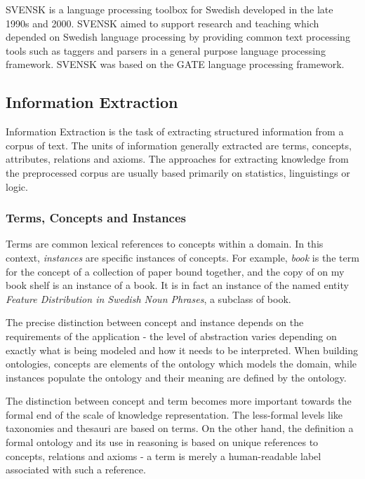 \documentclass[a4paper]{report}
\newcommand{\todo}[1]{}
\begin{document}
SVENSK is a language processing toolbox for Swedish developed in the late 1990s and 2000\cite{OlssonGamback00SVENSK}. SVENSK aimed to support research and teaching which depended on Swedish language processing by providing common text processing tools such as taggers and parsers in a general purpose language processing framework. SVENSK was based on the GATE language processing framework.

\subsection{Information Extraction}
\label{subsec:background:info_extraction}

Information Extraction is the task of extracting structured information from a corpus of text.
The units of information generally extracted are terms, concepts, attributes, relations and axioms.
The approaches for extracting knowledge from the preprocessed corpus are usually based primarily on statistics, linguistings or logic.

\subsubsection{Terms, Concepts and Instances}

Terms are common lexical references to concepts within a domain.
In this context, \emph{instances} are specific instances of concepts.
For example, \emph{book} is the term for the concept of a collection of paper bound together, and the copy of \todo{cite noun phrase book} on my book shelf is an instance of a book.
It is in fact an instance of the named entity \emph{Feature Distribution in Swedish Noun Phrases}, a subclass of book.

The precise distinction between concept and instance depends on the requirements of the application - the level of abstraction varies depending on exactly what is being modeled and how it needs to be interpreted.
When building ontologies, concepts are elements of the ontology which models the domain, while instances populate the ontology and their meaning are defined by the ontology.

The distinction between concept and term becomes more important towards the formal end of the scale of knowledge representation.
The less-formal levels like taxonomies and thesauri are based on terms.
On the other hand, the definition a formal ontology and its use in reasoning is based on unique references to concepts, relations and axioms - a term is merely a human-readable label associated with such a reference.
\end{document}
